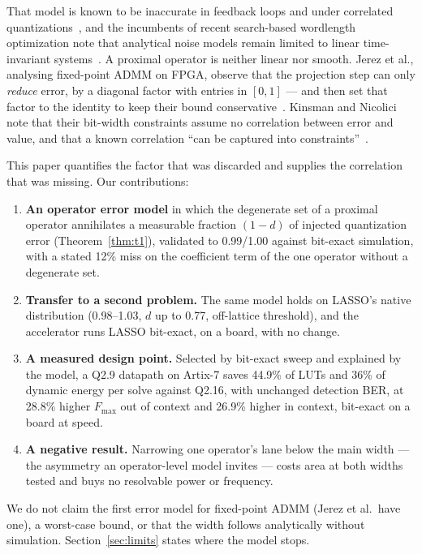 \documentclass[conference]{IEEEtran}
\begin{document}
That model is known to be inaccurate in feedback loops and under
correlated quantizations~\cite{lopez2007interval,naud2012correlation}, and the incumbents of
recent search-based wordlength optimization note that analytical noise
models remain limited to linear time-invariant systems~\cite{ha2020scalable,ha2023accuracy}. A proximal operator
is neither linear nor smooth. Jerez et al., analysing fixed-point ADMM on FPGA,
observe that the projection step can only \emph{reduce} error, by a diagonal
factor with entries in $[0,1]$ --- and then set that factor to the identity to
keep their bound conservative~\cite{jerez2014mpc}. Kinsman and Nicolici note that
their bit-width constraints assume no correlation between error and value, and
that a known correlation ``can be captured into
constraints''~\cite{kinsman2011iterative}.

This paper quantifies the factor that was discarded and supplies the
correlation that was missing. Our contributions:
\begin{enumerate}
\item \textbf{An operator error model} in which the degenerate set of a
proximal operator annihilates a measurable fraction $(1-d)$ of injected
quantization error (Theorem~\ref{thm:t1}), validated to 0.99/1.00 against
bit-exact simulation, with a stated 12\% miss on the coefficient term of the
one operator without a degenerate set.
\item \textbf{Transfer to a second problem.} The same model holds on LASSO's
native distribution (0.98--1.03, $d$ up to 0.77, off-lattice threshold), and
the accelerator runs LASSO bit-exact, on a board, with no change.
\item \textbf{A measured design point.} Selected by bit-exact sweep and
explained by the model, a Q2.9 datapath on Artix-7 saves 44.9\% of LUTs and
36\% of dynamic energy per solve against Q2.16, with unchanged detection BER, at 28.8\% higher $F_{\max}$ out of context and
26.9\% higher in context, bit-exact on a board at speed.
\item \textbf{A negative result.} Narrowing one operator's lane below the
main width --- the asymmetry an operator-level model invites --- costs area at
both widths tested and buys no resolvable power or frequency.
\end{enumerate}
We do not claim the first error model for fixed-point ADMM (Jerez et al.\ have
one), a worst-case bound, or that the width follows analytically without
simulation. Section~\ref{sec:limits} states where the model stops.
\end{document}
